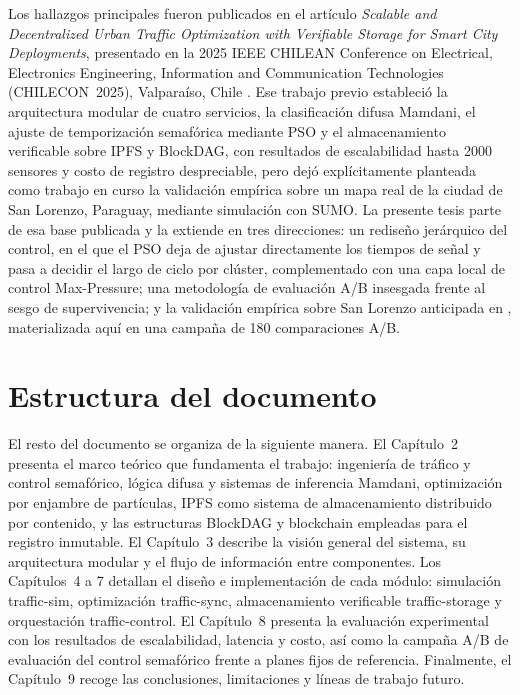 Los hallazgos principales fueron publicados en el artículo \emph{Scalable and Decentralized
Urban Traffic Optimization with Verifiable Storage for Smart City Deployments}, presentado en
la 2025 IEEE CHILEAN Conference on Electrical, Electronics Engineering, Information and
Communication Technologies (CHILECON~2025), Valparaíso, Chile \cite{chilecon2025}. Ese
trabajo previo estableció la arquitectura modular de cuatro servicios, la clasificación
difusa Mamdani, el ajuste de temporización semafórica mediante PSO y el almacenamiento
verificable sobre IPFS y BlockDAG, con resultados de escalabilidad hasta 2000 sensores y
costo de registro despreciable, pero dejó explícitamente planteada como trabajo en curso
la validación empírica sobre un mapa real de la ciudad de San Lorenzo, Paraguay, mediante
simulación con SUMO. La presente tesis parte de esa base publicada y la extiende en tres
direcciones: un rediseño jerárquico del control, en el que el PSO deja de ajustar
directamente los tiempos de señal y pasa a decidir el largo de ciclo por clúster,
complementado con una capa local de control Max-Pressure; una metodología de evaluación
A/B insesgada frente al sesgo de supervivencia; y la validación empírica sobre San
Lorenzo anticipada en \cite{chilecon2025}, materializada aquí en una campaña de 180
comparaciones A/B.

\section{Estructura del documento}

El resto del documento se organiza de la siguiente manera. El Capítulo~2 presenta el marco
teórico que fundamenta el trabajo: ingeniería de tráfico y control semafórico, lógica difusa
y sistemas de inferencia Mamdani, optimización por enjambre de partículas, IPFS como sistema
de almacenamiento distribuido por contenido, y las estructuras BlockDAG y blockchain
empleadas para el registro inmutable. El Capítulo~3 describe la visión general del sistema,
su arquitectura modular y el flujo de información entre componentes. Los Capítulos~4 a 7
detallan el diseño e implementación de cada módulo: simulación traffic-sim,
optimización traffic-sync, almacenamiento verificable traffic-storage y
orquestación traffic-control. El Capítulo~8 presenta la evaluación experimental con
los resultados de escalabilidad, latencia y costo, así como la campaña A/B de evaluación
del control semafórico frente a planes fijos de referencia. Finalmente, el Capítulo~9 recoge las
conclusiones, limitaciones y líneas de trabajo futuro.
